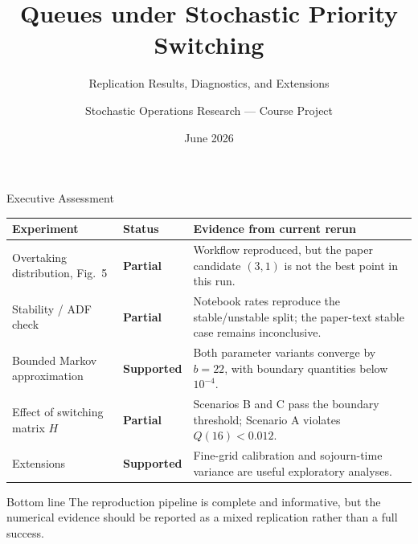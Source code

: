 \documentclass[aspectratio=169,10pt]{beamer}
\title[Replication diagnostics]{Queues under Stochastic Priority Switching}
\subtitle{Replication Results, Diagnostics, and Extensions}
\author{Stochastic Operations Research --- Course Project}
\date{June 2026}
\newcommand{\ok}{\textcolor{accent}{\textbf{Supported}}}
\newcommand{\partialok}{\textcolor{warn}{\textbf{Partial}}}
\newcommand{\tablefit}{\setlength{\tabcolsep}{3.5pt}\renewcommand{\arraystretch}{1.15}}
\begin{document}
\begin{frame}[plain]
\titlepage
\end{frame}

\begin{frame}[t]{Executive Assessment}
\vspace{-0.35em}
{\scriptsize\tablefit
\begin{tabularx}{\textwidth}{@{}L{0.26\textwidth}L{0.16\textwidth}Y@{}}
\toprule
Experiment & Status & Evidence from current rerun \\
\midrule
Overtaking distribution, Fig.\ 5 & \partialok &
Workflow reproduced, but the paper candidate $(3,1)$ is not the best point in this run. \\
Stability / ADF check & \partialok &
Notebook rates reproduce the stable/unstable split; the paper-text stable case remains inconclusive. \\
Bounded Markov approximation & \ok &
Both parameter variants converge by $b=22$, with boundary quantities below $10^{-4}$. \\
Effect of switching matrix $H$ & \partialok &
Scenarios B and C pass the boundary threshold; Scenario A violates $Q(16)<0.012$. \\
Extensions & \ok &
Fine-grid calibration and sojourn-time variance are useful exploratory analyses. \\
\bottomrule
\end{tabularx}
}

\vspace{0.5em}
\begin{block}{Bottom line}
\footnotesize
The reproduction pipeline is complete and informative, but the numerical evidence should be reported as a mixed replication rather than a full success.
\end{block}
\end{frame}
\end{document}
